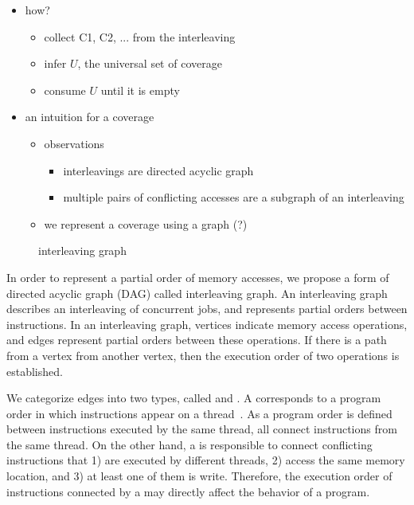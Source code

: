 \begin{itemize}
\item how?
  \begin{itemize}
  \item collect {C1, C2, ...} from the interleaving
  \item infer $U$, the universal set of coverage
  \item consume $U$ until it is empty
  \end{itemize}
\item an intuition for a coverage
  \begin{itemize}
  \item observations
    \begin{itemize}
    \item interleavings are directed acyclic graph
    \item multiple pairs of conflicting accesses are a subgraph of an interleaving
    \end{itemize}
  \item we represent a coverage using a graph (?)
  \end{itemize}
\end{itemize}



\begin{figure}[t]
  \caption{interleaving graph}
  \label{fig:interleaving-graph}
\end{figure}

In order to represent a partial order of memory accesses, we propose a
form of directed acyclic graph (DAG) called interleaving graph.
%
An interleaving graph describes an interleaving of concurrent jobs,
and represents partial orders between instructions.
%
In an interleaving graph, vertices indicate memory access operations,
and edges represent partial orders between these operations.
%
If there is a path from a vertex from another vertex, then the
execution order of two operations is established.

We categorize edges into two types, called \immutables and \mutables.
%
A \immutable corresponds to a program order in which instructions
appear on a thread~\cite{frightening, lkmm}. As a program order is
defined between instructions executed by the same thread, all
\immutables connect instructions from the same thread.
%
On the other hand, a \mutable is responsible to connect conflicting
instructions that 1) are executed by different threads, 2) access the
same memory location, and 3) at least one of them is write.
%
Therefore, the execution order of instructions connected by a \mutable
may directly affect the behavior of a program.


